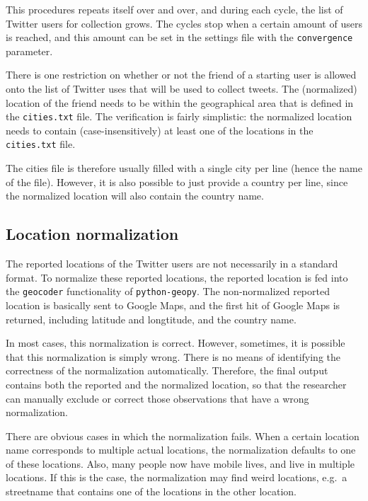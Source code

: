 \documentclass[a4paper,11pt]{article}
\begin{document}
This procedures repeats itself over and over, and during each cycle, the list of Twitter users for collection grows. The cycles stop when a certain amount of users is reached, and this amount can be set in the settings file with the \texttt{convergence} parameter.

There is one restriction on whether or not the friend of a starting user is allowed onto the list of Twitter uses that will be used to collect tweets. The (normalized) location of the friend needs to be within the geographical area that is defined in the \texttt{cities.txt} file. The verification is fairly simplistic: the normalized location needs to contain (case-insensitively) at least one of the locations in the \texttt{cities.txt} file.

The cities file is therefore usually filled with a single city per line (hence the name of the file). However, it is also possible to just provide a country per line, since the normalized location will also contain the country name.

\subsection{Location normalization}

The reported locations of the Twitter users are not necessarily in a standard format. To normalize these reported locations, the reported location is fed into the \texttt{geocoder} functionality of \texttt{python-geopy}. The non-normalized reported location is basically sent to Google Maps, and the first hit of Google Maps is returned, including latitude and longtitude, and the country name.

In most cases, this normalization is correct. However, sometimes, it is possible that this normalization is simply wrong. There is no means of identifying the correctness of the normalization automatically. Therefore, the final output contains both the reported and the normalized location, so that the researcher can manually exclude or correct those observations that have a wrong normalization.

There are obvious cases in which the normalization fails. When a certain location name corresponds to multiple actual locations, the normalization defaults to one of these locations. Also, many people now have mobile lives, and live in multiple locations. If this is the case, the normalization may find weird locations, e.g.~a streetname that contains one of the locations in the other location.
\end{document}
